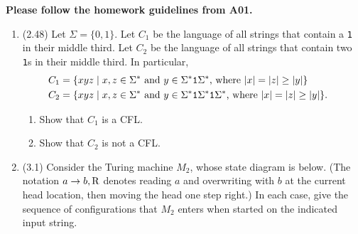 \documentclass[11pt]{article}
\begin{document}
\assignmentnametitlestuff


\if{}
{\bf Please follow the homework guidelines from A01.}

\fi


\begin{enumerate}

\item (2.48) Let $\Sigma = \{0,1\}$. Let $C_1$ be the language of all strings that contain a {\tt 1} in their middle third. Let $C_2$ be the language of all strings that contain two {\tt 1}s in their middle third. In particular,
\begin{align*}
C_1 &= \{xyz \mid x,z \in \Sigma^* \textnormal{ and $y \in \Sigma^*{\tt 1}\Sigma^*$, where $|x| = |z| \ge |y|$}\} \cr
C_2 &= \{xyz \mid x,z \in \Sigma^* \textnormal{ and $y \in \Sigma^*{\tt 1}\Sigma^*{\tt 1}\Sigma^*$, where $|x| = |z| \ge |y|$}\}.
\end{align*}
\begin{enumerate}
\item Show that $C_1$ is a CFL.
\item Show that $C_2$ is not a CFL.

\end{enumerate}

\item (3.1) Consider the Turing machine $M_2$, whose state diagram is below. (The notation $a \to b, \text{R}$ denotes reading $a$ and overwriting with $b$ at the current head location, then moving the head one step right.) In each case, give the sequence of configurations that $M_2$ enters when started on the indicated input string.


\end{enumerate}
\end{document}
